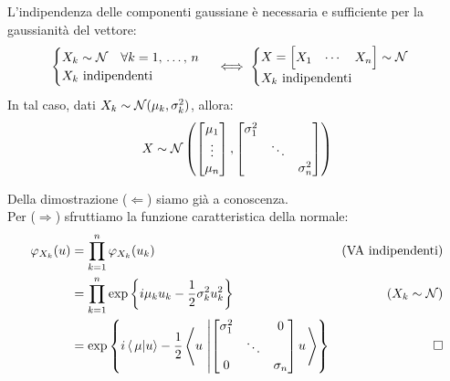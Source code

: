 \medskip
\begin{prop}
  L’indipendenza delle componenti gaussiane è necessaria e sufficiente per la gaussianità del vettore:
  $$\begin{cases}X_k \sim \mathcal N \quad \forall k=1, \, \dots, \,  n \\ X_k \text{ indipendenti} \end{cases}
  \iff
  \begin{cases} X= \begin{bmatrix} X_1 & \cdots & X_n \end{bmatrix} \sim \mathcal N \\ X_k \text{ indipendenti} \end{cases}$$
  In tal caso, dati $X_k \sim \mathcal N( \mu_k, \sigma_k^2)$, allora: 
  $$X \sim \mathcal N \left(\begin{bmatrix} \mu_1 \\ \vdots \\ \mu_n \end{bmatrix}, \begin{bmatrix} \sigma_1^2 & \  &  \  \\  \  & \ddots &  \  \\ \ & \  & \sigma_n^2 \end{bmatrix}\right)$$
\end{prop}
\begin{dimo}
  Della dimostrazione ($\Longleftarrow$) siamo già a conoscenza. \\
  Per ($\Longrightarrow$) sfruttiamo la funzione caratteristica della normale:
  \begin{align*}
  \varphi_{X_k}(u) &= \prod_{k=1}^n \varphi_{X_k}(u_k)  & (\text{VA indipendenti})\\
  &=  \prod_{k=1}^n  \exp \left \{i \mu_k u_k - \frac{1}{2} \sigma_k^2 u_k^2 \right \} & (X_k \sim \mathcal N)\\
  &=  \exp \left \{i \, \langle \, \mu|u \rangle - \frac{1}{2} \left \langle u \, \left| \begin{bmatrix} \sigma_1^2 & \  &  0  \\  \  & \ddots &  \  \\ 0 & \  & \sigma_n \end{bmatrix} u \right. \right \rangle \right \} & \qedhere
  \end{align*}
\end{dimo}

